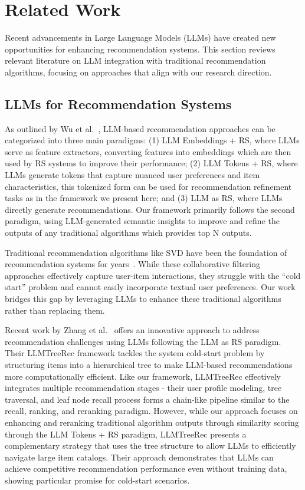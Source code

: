 \documentclass[sigconf]{acmart}
\begin{document}
\section{Related Work}

Recent advancements in Large Language Models (LLMs) have created new opportunities for enhancing recommendation systems. This section reviews relevant literature on LLM integration with traditional recommendation algorithms, focusing on approaches that align with our research direction.

\subsection{LLMs for Recommendation Systems}

As outlined by Wu et al.~\cite{wu2024survey}, LLM-based recommendation approaches can be categorized into three main paradigms: (1) LLM Embeddings + RS, where LLMs serve as feature extractors, converting features into embeddings which are then used by RS systems to improve their performance; (2) LLM Tokens + RS, where LLMs generate tokens that capture nuanced user preferences and item characteristics, this tokenized form can be used for recommendation refinement tasks as in the framework we present here; and (3) LLM as RS, where LLMs directly generate recommendations. Our framework primarily follows the second paradigm, using LLM-generated semantic insights to improve and refine the outputs of any traditional algorithms which provides top N outputs.

Traditional recommendation algorithms like SVD have been the foundation of recommendation systems for years~\cite{koren2009matrix}. While these collaborative filtering approaches effectively capture user-item interactions, they struggle with the ``cold start'' problem and cannot easily incorporate textual user preferences. Our work bridges this gap by leveraging LLMs to enhance these traditional algorithms rather than replacing them.

Recent work by Zhang et al.~\cite{zhang2024llmtreerec} offers an innovative approach to address recommendation challenges using LLMs following the LLM as RS paradigm. Their LLMTreeRec framework tackles the system cold-start problem by structuring items into a hierarchical tree to make LLM-based recommendations more computationally efficient. Like our framework, LLMTreeRec effectively integrates multiple recommendation stages - their user profile modeling, tree traversal, and leaf node recall process forms a chain-like pipeline similar to the recall, ranking, and reranking paradigm. However, while our approach focuses on enhancing and reranking traditional algorithm outputs through similarity scoring through the LLM Tokens + RS paradigm, LLMTreeRec presents a complementary strategy that uses the tree structure to allow LLMs to efficiently navigate large item catalogs. Their approach demonstrates that LLMs can achieve competitive recommendation performance even without training data, showing particular promise for cold-start scenarios.
\end{document}
